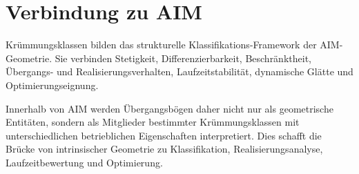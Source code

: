 \section{Verbindung zu AIM}

\begin{summary}
Krümmungsklassen bilden das strukturelle Klassifikations-Framework der
AIM-Geometrie. Sie verbinden Stetigkeit, Differenzierbarkeit, Beschränktheit,
Übergangs- und Realisierungsverhalten, Laufzeitstabilität, dynamische Glätte
und Optimierungseignung.

Innerhalb von AIM werden Übergangsbögen daher nicht nur als geometrische
Entitäten, sondern als Mitglieder bestimmter Krümmungsklassen mit
unterschiedlichen betrieblichen Eigenschaften interpretiert. Dies schafft die
Brücke von intrinsischer Geometrie zu Klassifikation, Realisierungsanalyse,
Laufzeitbewertung und Optimierung.
\end{summary}
